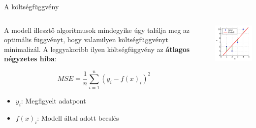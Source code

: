 \documentclass[english, aspectratio=169]{beamer}
\begin{document}
\begin{frame}{A költségfüggvény}
\begin{columns}
\begin{column}{.5\textwidth}
A modell illesztő algoritmusok mindegyike úgy találja meg az optimális függvényt, hogy valamilyen költségfüggvényt minimalizál. A leggyakoribb ilyen költségfüggvény az \textbf{átlagos négyzetes hiba}:
\begin{block}{}
\[
MSE = \frac{1}{n} \sum_{i=1}^n \left( y_i - f(x)_i \right)^2
\]
\begin{itemize}
	\item $y_i$: Megfigyelt adatpont
	\item $f(x)_i$: Modell által adott becslés
\end{itemize}
\end{block}
\end{column}
\begin{column}{.5\textwidth}
\begin{center}
\includegraphics[width=6cm, keepaspectratio]{images/ql_11.png}
\end{center}
\end{column}
\end{columns}
\end{frame}
\end{document}
